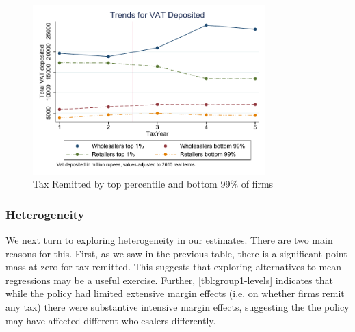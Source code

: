 
\begin{figure}[t] 
\includegraphics[width=0.8\textwidth]{graphs/MoneyDepositedTrendsTopPercentilePanel_Annual_Real.pdf}
\caption{Tax Remitted by top percentile and bottom 99\% of firms}
\label{fig:money-onepercentile}
\end{figure}

\subsubsection{Heterogeneity}
\label{subsubsec:diffindiff_heterogeneity}
We next turn to exploring heterogeneity in our estimates. There are two main reasons for this. First, as we saw in the previous table, there is a significant point mass at zero for tax remitted. This suggests that exploring alternatives to mean regressions may be a useful exercise. Further, \cref{tbl:group1-levels} indicates that while the policy had limited extensive margin effects (i.e. on whether firms remit any tax) there were substantive intensive margin effects, suggesting the the policy may have affected different wholesalers differently.


